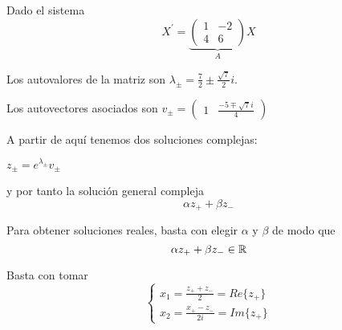 \begin{example}[(Método 1)]
Dado el sistema $$X^\prime = \underbrace{\begin{pmatrix}
1 & -2\\ 4 & 6
\end{pmatrix}}_AX$$

Los autovalores de la matriz son $\lambda_\pm = \frac{7}{2} \pm \frac{\sqrt{7}}{2}i$.

Los autovectores asociados son $v_\pm = \begin{pmatrix}
1& \frac{-5\mp\sqrt{7}i}{4}
\end{pmatrix}$

A partir de aquí tenemos dos soluciones complejas:
\begin{center}
$z_\pm = e^{\lambda_\pm}v_\pm$
\end{center}

y por tanto la solución general compleja$$\alpha z_+ + \beta z_-$$

Para obtener soluciones reales, basta con elegir $\alpha$ y $\beta$ de modo que $$\alpha z_+ + \beta z_- \in \mathbb{R}$$

Basta con tomar \begin{equation*}
  \left\lbrace
  \begin{array}{l}
	x_1 = \frac{z_++z_-}{2} = Re\{ z_+ \}\\
	x_2 = \frac{x_+-z_-}{2i} = Im \{ z_+ \}
  \end{array}
  \right.
\end{equation*}
\end{example}

